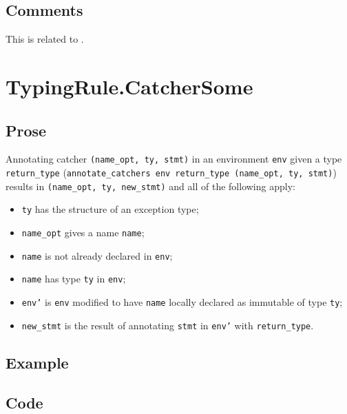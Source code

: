 \documentclass{book}
\begin{document}
\subsection{Comments}
    This is related to .

\section{TypingRule.CatcherSome \label{sec:TypingRule.CatcherSome}}

  \subsection{Prose}
   Annotating catcher \texttt{(name\_opt, ty, stmt)} in an environment
\texttt{env} given a type \texttt{return\_type} (\texttt{annotate\_catchers env
return\_type (name\_opt, ty, stmt)}) results in \texttt{(name\_opt, ty,
new\_stmt)} and all of the following apply:
   \begin{itemize}
   \item \texttt{ty} has the structure of an exception type;
   \item \texttt{name\_opt} gives a name \texttt{name};
   \item \texttt{name} is not already declared in \texttt{env};
   \item \texttt{name} has type \texttt{ty} in \texttt{env}; 
   \item \texttt{env'} is \texttt{env} modified to have \texttt{name} locally declared as immutable of type \texttt{ty};
   \item \texttt{new\_stmt} is the result of annotating \texttt{stmt} in \texttt{env'} with \texttt{return\_type}.
   \end{itemize}

  \subsection{Example}

  \subsection{Code}
\end{document}
